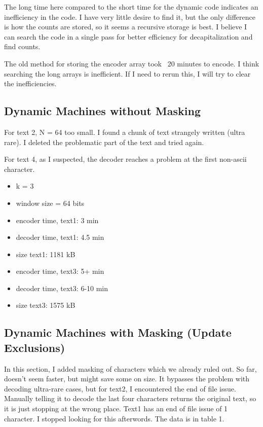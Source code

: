 \documentclass{article}
\begin{document}
The long time here compared to the short time for the dynamic code indicates an inefficiency in the code. I have very little desire to find it, but the only difference is how the counts are stored, so it seems a recursive storage is best. I believe I can search the code in a single pass for better efficiency for decapitalization and find counts.

The old method for storing the encoder array took ~20 minutes to encode. I think searching the long arrays is inefficient. If I need to rerun this, I will try to clear the inefficiencies.


\subsection{Dynamic Machines without Masking}

For text 2, N = 64 too small. I found a chunk of text strangely written (ultra rare). I deleted the problematic part of the text and tried again.

For text 4, as I suspected, the decoder reaches a problem at the first non-ascii character.


\begin{itemize}
\item k = 3
\item window size = 64 bits
\item encoder time, text1: 3 min
\item decoder time, text1: 4.5 min
\item size text1: 1181 kB
\item encoder time, text3: 5+ min
\item decoder time, text3: 6-10 min
\item size text3: 1575 kB
\end{itemize}



\subsection{Dynamic Machines with Masking (Update Exclusions)}

In this section, I added masking of characters which we already ruled out. So far, doesn't seem faster, but might save some on size. It bypasses the problem with decoding ultra-rare cases, but for text2, I encountered the end of file issue. Manually telling it to decode the last four characters returns the original text, so it is just stopping at the wrong place. Text1 has an end of file issue of 1 character. I stopped looking for this afterwords. The data is in table 1.
\end{document}
